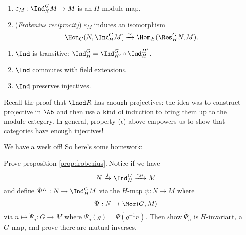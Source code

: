 \documentclass[12pt]{article}
\begin{document}
\begin{prop}\label{prop:frobenius}
	\begin{enumerate}
		\item $\varepsilon_M:\Ind_H^G M\to M$ is an $H$-module map.
		\item (\textit{Frobenius reciprocity}) $\varepsilon_M$ induces an isomorphism 
		\[\Hom_G(N,\Ind_H^G M)\xrightarrow{\sim}\Hom_H(\Res_H^G N, M).\]
	\end{enumerate}
\end{prop}
\begin{cor}
	\begin{enumerate}
		\item $\Ind$ is transitive: $\Ind_H^G=\Ind_{H'}^G\circ\Ind_H^{H'}$.
		\item $\Ind$ commutes with field extensions.
		\item $\Ind$ preserves injectives.
	\end{enumerate}
\end{cor}
\begin{rmk}
	Recall the proof that $\lmod R$ has enough projectives: the idea was to construct projective in $\Ab$ and then 
	use a kind of induction to bring them up to the module category. In general, property (c) above empowers us to show 
	that categories have enough injectives!
\end{rmk}
We have a week off! So here's some homework:
\begin{prob}
	Prove proposition \ref{prop:frobenius}. Notice if we have 
	\[N\xrightarrow{f}\Ind_H^G\xrightarrow{\varepsilon_M} M\]
	and define $\tilde\Psi^H:N\to \Ind_H^G M$ via the $H$-map $\psi:N\to M$ where 
	\[\tilde\Psi:N\to \Mor(G,M)\]
	via $n\mapsto \tilde\Psi_n:G\to M$ where $\tilde\Psi_n(g)=\Psi(g^{-1}n)$. Then show $\tilde\Psi_n$ is $H$-invariant, a $G$-map, and prove there are mutual inverses.
\end{prob}
\end{document}

